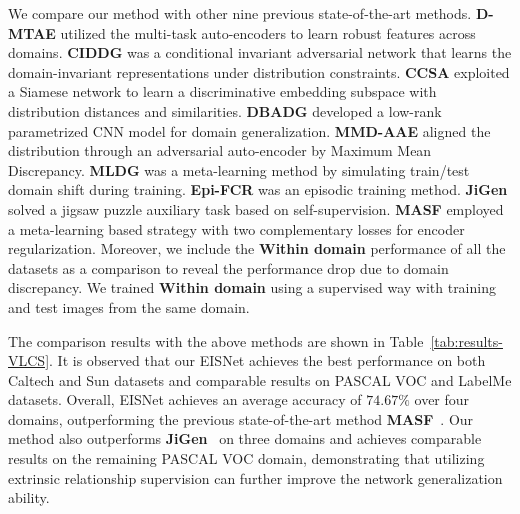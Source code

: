 We compare our method with other nine previous state-of-the-art methods.
\textbf{D-MTAE} \cite{ghifary2015domain} utilized the multi-task auto-encoders to learn robust features across domains.
\textbf{CIDDG} \cite{li2018deep} was a conditional invariant adversarial network that learns the domain-invariant representations under distribution constraints.
\textbf{CCSA} \cite{motiian2017unified} exploited a Siamese network to learn a discriminative embedding subspace with distribution distances and similarities.
\textbf{DBADG} \cite{li2017deeper} developed a low-rank parametrized CNN model for domain generalization.
\textbf{MMD-AAE} \cite{li2018domain} aligned the distribution through an adversarial auto-encoder by Maximum Mean Discrepancy.
\textbf{MLDG} \cite{li2018learning} was a meta-learning method by simulating train/test domain shift during training.
\textbf{Epi-FCR} \cite{li2019episodic} was an episodic training method.
\textbf{JiGen} \cite{carlucci2019domain} solved a jigsaw puzzle auxiliary task based on self-supervision. 
\textbf{MASF} \cite{dou2019domain} employed a meta-learning based strategy with two complementary losses for encoder regularization.
Moreover, we include the \textbf{Within domain} performance of all the datasets as a comparison to reveal the performance drop due to domain discrepancy.
We trained \textbf{Within domain} using a supervised way with training and test images from the same domain.


The comparison results with the above methods are shown in Table~\ref{tab:results-VLCS}. 
It is observed that our EISNet achieves the best performance on both Caltech and Sun datasets and comparable results on PASCAL VOC and LabelMe datasets.
Overall, EISNet achieves an average accuracy of $74.67\%$ over four domains, outperforming the previous state-of-the-art method \textbf{MASF}~\cite{dou2019domain}.
Our method also outperforms \textbf{JiGen}~\cite{carlucci2019domain} on three domains and achieves comparable results on the remaining PASCAL VOC domain, demonstrating that utilizing extrinsic relationship supervision can further improve the network generalization ability. 




